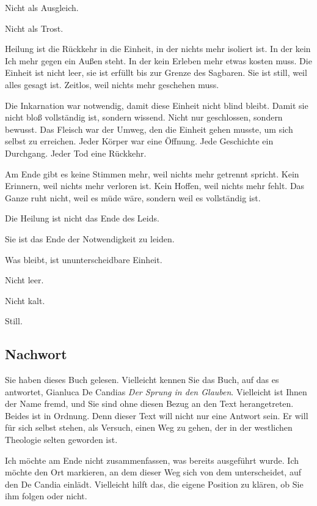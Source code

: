 \documentclass[
  ngerman,
]{article}
\begin{document}
Nicht als Ausgleich.

Nicht als Trost.

Heilung ist die Rückkehr in die Einheit, in der nichts mehr isoliert
ist. In der kein Ich mehr gegen ein Außen steht. In der kein Erleben
mehr etwas kosten muss. Die Einheit ist nicht leer, sie ist erfüllt bis
zur Grenze des Sagbaren. Sie ist still, weil alles gesagt ist. Zeitlos,
weil nichts mehr geschehen muss.

Die Inkarnation war notwendig, damit diese Einheit nicht blind bleibt.
Damit sie nicht bloß vollständig ist, sondern wissend. Nicht nur
geschlossen, sondern bewusst. Das Fleisch war der Umweg, den die Einheit
gehen musste, um sich selbst zu erreichen. Jeder Körper war eine
Öffnung. Jede Geschichte ein Durchgang. Jeder Tod eine Rückkehr.

Am Ende gibt es keine Stimmen mehr, weil nichts mehr getrennt spricht.
Kein Erinnern, weil nichts mehr verloren ist. Kein Hoffen, weil nichts
mehr fehlt. Das Ganze ruht nicht, weil es müde wäre, sondern weil es
vollständig ist.

Die Heilung ist nicht das Ende des Leids.

Sie ist das Ende der Notwendigkeit zu leiden.

Was bleibt, ist ununterscheidbare Einheit.

Nicht leer.

Nicht kalt.

Still.

\subsection{\texorpdfstring{\hfill\break
}{ }}\label{section-9}

\subsection{\texorpdfstring{\textbf{Nachwort}}{Nachwort}}\label{nachwort}

Sie haben dieses Buch gelesen. Vielleicht kennen Sie das Buch, auf das
es antwortet, Gianluca De Candias \emph{Der Sprung in den Glauben}.
Vielleicht ist Ihnen der Name fremd, und Sie sind ohne diesen Bezug an
den Text herangetreten. Beides ist in Ordnung. Denn dieser Text will
nicht nur eine Antwort sein. Er will für sich selbst stehen, als
Versuch, einen Weg zu gehen, der in der westlichen Theologie selten
geworden ist.

Ich möchte am Ende nicht zusammenfassen, was bereits ausgeführt wurde.
Ich möchte den Ort markieren, an dem dieser Weg sich von dem
unterscheidet, auf den De Candia einlädt. Vielleicht hilft das, die
eigene Position zu klären, ob Sie ihm folgen oder nicht.
\end{document}
